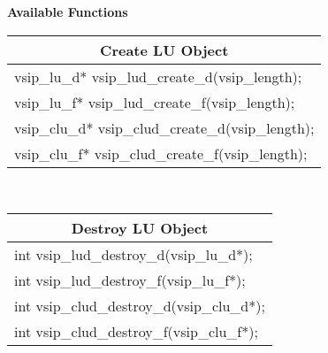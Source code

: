 \\\cvsiplh 
\\ \hspace*{.8cm} \vspace*{.1cm} \textbf{Available Functions }
%
\\ \hspace*{.9cm} {
\ttfamily\vspace{.3cm}
\begin{tabular}{|l|}
\multicolumn{1}{c}{\rmfamily \bfseries Create LU Object\vspace{.1cm}}\\ \hline
vsip\_lu\_d* vsip\_lud\_create\_d(vsip\_length);\\
vsip\_lu\_f* vsip\_lud\_create\_f(vsip\_length);\\
vsip\_clu\_d* vsip\_clud\_create\_d(vsip\_length);\\
vsip\_clu\_f* vsip\_clud\_create\_f(vsip\_length);\\
\hline\end{tabular}\\}
%
\hspace*{.9cm} {
\ttfamily\vspace{.3cm}
\begin{tabular}{|l|}
\multicolumn{1}{c}{\rmfamily \bfseries Destroy LU Object\vspace{.1cm}}\\ \hline
int vsip\_lud\_destroy\_d(vsip\_lu\_d*);\\
int vsip\_lud\_destroy\_f(vsip\_lu\_f*);\\
int vsip\_clud\_destroy\_d(vsip\_clu\_d*);\\
int vsip\_clud\_destroy\_f(vsip\_clu\_f*);\\
\hline\end{tabular}\\}
